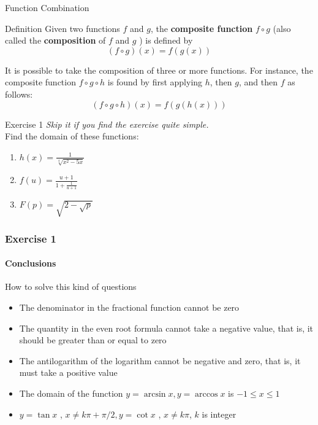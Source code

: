 \documentclass{beamer}
\begin{document}
\begin{frame}{Function Combination}
    \begin{block}{Definition}
        Given two functions $f$ and $g$, the \textbf{composite function} $f \circ g$ (also called the \textbf{composition} of $f$ and $g$ ) is defined by
        \begin{equation*}
            (f \circ g)(x)=f(g(x))
        \end{equation*}
    \end{block}
    \bigskip
    It is possible to take the composition of three or more functions. For instance, the composite function $f \circ g \circ h$ is found by first applying $h$, then $g$, and then $f$ as follows:
    $$
    (f \circ g \circ h)(x)=f(g(h(x)))
    $$
\end{frame}

\begin{frame}{Exercise 1}
    \textit{Skip it if you find the exercise quite simple.}\\
\bigskip
    Find the domain of these functions:
\begin{enumerate}
    \item $h(x)=\frac{1}{\sqrt[4]{x^{2}-5 x}}$\\
    \item $f(u)=\frac{u+1}{1+\frac{1}{u+1}}$\\
    \item $F(p)=\sqrt{2-\sqrt{p}}$
\end{enumerate}
\end{frame}

\begin{frame}
\frametitle{Exercise 1}
\framesubtitle{Conclusions}
    \begin{block}{How to solve this kind of questions}
        \begin{itemize}
            \item The denominator in the fractional function cannot be zero
            \item The quantity in the even root formula cannot take a negative value, that is, it should be greater than or equal to zero
            \item The antilogarithm of the logarithm cannot be negative and zero, that is, it must take a positive value
            \item The domain of the function $y=\arcsin x, y=\arccos x$ is $-1 \leqslant x \leqslant 1$
            \item $y=\tan x$ , $x \neq k \pi+\pi / 2, y=\cot x$ , $x \neq k \pi$, $k$ is integer
        \end{itemize}
    \end{block}
\end{frame}
\end{document}
